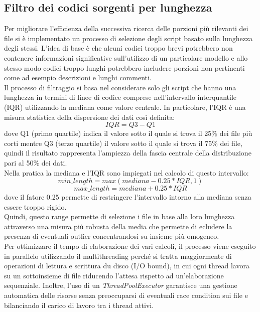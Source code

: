 \documentclass{article}
\begin{document}
\subsection{Filtro dei codici sorgenti per lunghezza}
Per migliorare l'efficienza della successiva ricerca delle porzioni più rilevanti dei file si è implementato un processo di selezione degli script basato sulla lunghezza degli stessi. L'idea di base è che alcuni codici troppo brevi potrebbero non contenere informazioni significative sull'utilizzo di un particolare modello e allo stesso modo codici troppo lunghi potrebbero includere porzioni non pertinenti come ad esempio descrizioni e lunghi commenti.\\
Il processo di filtraggio si basa nel considerare solo gli script che hanno una lunghezza in termini di linee di codice comprese nell'intervallo interquantile (IQR) utilizzando la mediana come valore centrale. In particolare, l'IQR è una misura statistica della dispersione dei dati così definita:
\[
IQR = Q3 - Q1
\]
dove Q1 (primo quartile) indica il valore sotto il quale si trova il 25\% dei file più corti mentre Q3 (terzo quartile) il valore sotto il quale si trova il 75\% dei file, quindi il risultato rappresenta l'ampiezza della fascia centrale della distribuzione pari al 50\% dei dati.\\
Nella pratica la mediana e l'IQR sono impiegati nel calcolo di questo intervallo:
\[
min\_length =max(mediana-0.25*IQR,1)
\]
\[
max\_length =mediana+0.25*IQR
\]
dove il fatore 0.25 permette di restringere l'intervallo intorno alla mediana senza essere troppo rigido.\\
Quindi, questo range permette di selezione i file in base alla loro lunghezza attraverso una misura più robusta della media che permette di ecludere la presenza di eventuali outlier concentrandosi su insieme più omogeneo.\\
Per ottimizzare il tempo di elaborazione dei vari calcoli, il processo viene eseguito in parallelo utilizzando il multithreading perché si tratta maggiormente di operazioni di lettura e scrittura du disco (I/O bound), in cui ogni thread lavora su un sottoinsieme di file riducendo l'attesa rispetto ad un'elaborazione sequenziale. Inoltre, l'uso di un \textit{ThreadPoolExecutor} garantisce una gestione automatica delle risorse senza preoccuparsi di eventuali race condition sui file e bilanciando il carico di lavoro tra i thread attivi.
\end{document}
